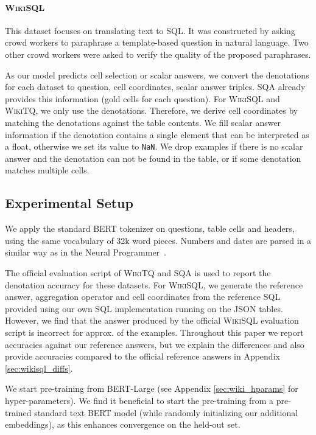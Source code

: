 \documentclass[11pt,a4paper]{article}
\newcommand\la{}
\newcommand\ra{}
\newcommand\sqa{\textsc{SQA}\xspace}
\newcommand\wikisql{\textsc{WikiSQL}\xspace}
\newcommand\wtq{\textsc{WikiTQ}\xspace}
\begin{document}
\paragraph{\wikisql{} \cite{zhong2017seq2sql}} This dataset focuses on translating text to SQL. It was constructed by asking crowd workers to paraphrase a template-based question in natural language.
Two other crowd workers were asked to verify the quality of the proposed paraphrases. 

\vspace{3mm}

As our model predicts cell selection or scalar answers, we convert the denotations for each dataset to \la{}question, cell coordinates, scalar answer\ra{} triples. \sqa{} already provides this information (gold cells for each question). For \wikisql{} and \wtq{}, we only use the denotations.
Therefore, we derive cell coordinates by matching the denotations against the table contents. We fill scalar answer information if the denotation contains a single element that can be interpreted as a float, otherwise we set its value to \texttt{NaN}.
We drop examples if there is no scalar answer and the denotation can not be found in the table, or if some denotation matches multiple cells.

\subsection{Experimental Setup}
\label{sec:exp_setup}

We apply the standard BERT tokenizer on questions, table cells and headers, using the same vocabulary of 32k word pieces. Numbers and dates are parsed in a similar way as in the Neural Programmer~\cite{neelakantan2017learning}.

The official evaluation script of \wtq{} and \sqa{} is used to report the denotation accuracy for these datasets. 
For \wikisql{}, we generate the reference answer, aggregation operator and cell coordinates from the reference SQL provided using our own SQL implementation running on the JSON tables.
However, we find that the answer produced by the official \wikisql{} evaluation script is incorrect for approx.  of the examples.
Throughout this paper we report accuracies against our reference answers, but we explain the differences and also provide accuracies compared to the official reference answers in Appendix \ref{sec:wikisql_diffs}.

We start pre-training from BERT-Large (see Appendix \ref{sec:wiki_hparams} for hyper-parameters). We find it beneficial to start the pre-training from a pre-trained standard text BERT model (while randomly initializing our additional embeddings), as this enhances convergence on the held-out set.
\end{document}
